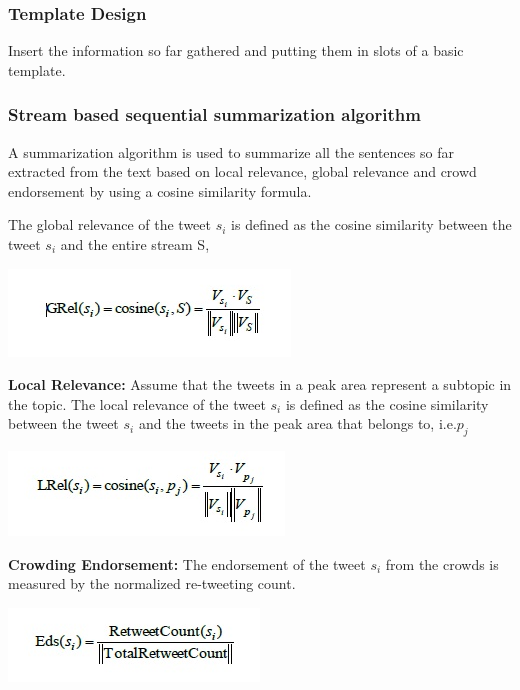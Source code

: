 \documentclass[conference]{IEEEtran}
\begin{document}
\subsubsection{\textbf{Template Design}}
\par Insert the information so far gathered and putting them in slots of a basic template.

\subsubsection{\textbf{Stream based sequential summarization algorithm}}
\par A summarization algorithm is used to summarize all the sentences so far extracted from the text based on local relevance, global relevance and crowd endorsement by using a cosine similarity formula.

\par The global relevance of the tweet $s_i$ is defined as the cosine similarity between the tweet $s_i$ and the entire stream S, 

\begin{center}
\includegraphics[scale=0.8]{formula1.jpg}
\end{center}

\par \textbf{Local Relevance:} Assume that the tweets in a peak area represent a subtopic in the topic. The local relevance of the tweet $s_i$ is defined as the cosine similarity between the tweet $s_i$ and the tweets in the peak area that belongs to, i.e.$p_j$

\begin{center}
\includegraphics{formula2.jpg}
\end{center}

\par \textbf{Crowding Endorsement:} The endorsement of the tweet $s_i$ from the crowds is measured by the normalized re-tweeting count.

\begin{center}
\includegraphics{formula3.jpg}
\end{center}
\end{document}
